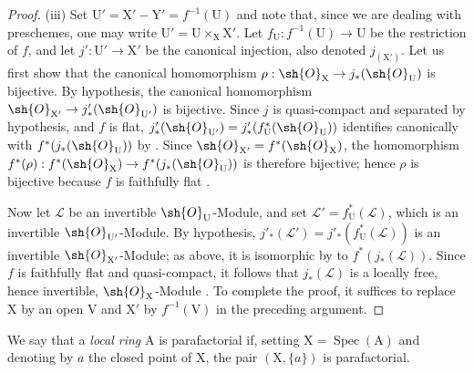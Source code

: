 \begin{proof}
(iii) Set $\mathrm{U}'=\mathrm{X}'-\mathrm{Y}'=f^{-1}(\mathrm{U})$ and note that, since we are dealing with preschemes, one may write $\mathrm{U}'=\mathrm{U}\times_{\mathrm{X}}\mathrm{X}'$. Let $f_{\mathrm{U}}:f^{-1}(\mathrm{U})\to\mathrm{U}$ be the restriction of $f$, and let $j':\mathrm{U}'\to\mathrm{X}'$ be the canonical injection, also denoted $j_{(\mathrm{X}')}$.
Let us first show that the canonical homomorphism $\rho:\sh{O}_{\mathrm{X}}\to j_*(\sh{O}_{\mathrm{U}})$ is bijective. By hypothesis, the canonical homomorphism $\sh{O}_{\mathrm{X}'}\to j'_*(\sh{O}_{\mathrm{U}'})$ is bijective. Since $j$ is quasi-compact and separated by hypothesis, and $f$ is flat, $j'_*(\sh{O}_{\mathrm{U}'})=j'_*(f_{\mathrm{U}}^*(\sh{O}_{\mathrm{U}}))$ identifies canonically with $f^*(j_*(\sh{O}_{\mathrm{U}}))$ by . Since $\sh{O}_{\mathrm{X}'}=f^*(\sh{O}_{\mathrm{X}})$, the homomorphism $f^*(\rho):f^*(\sh{O}_{\mathrm{X}})\to f^*(j_*(\sh{O}_{\mathrm{U}}))$ is therefore bijective; hence $\rho$ is bijective because $f$ is faithfully flat .

Now let $\mathscr{L}$ be an invertible $\sh{O}_{\mathrm{U}}$-Module, and set $\mathscr{L}'=f_{\mathrm{U}}^*(\mathscr{L})$, which is an invertible $\sh{O}_{\mathrm{U}'}$-Module. By hypothesis, $j'_*(\mathscr{L}')=j'_*(f_{\mathrm{U}}^*(\mathscr{L}))$ is an invertible $\sh{O}_{\mathrm{X}'}$-Module; as above, it is isomorphic by  to $f^*(j_*(\mathscr{L}))$. Since $f$ is faithfully flat and quasi-compact, it follows that $j_*(\mathscr{L})$ is a locally free, hence invertible, $\sh{O}_{\mathrm{X}}$-Module . To complete the proof, it suffices to replace $\mathrm{X}$ by an open $\mathrm{V}$ and $\mathrm{X}'$ by $f^{-1}(\mathrm{V})$ in the preceding argument.
\end{proof}

\begin{definition}[21.13.7]
\label{IV.21.13.7}
We say that a \emph{local ring} $\mathrm{A}$ is parafactorial if, setting $\mathrm{X}=\operatorname{Spec}(\mathrm{A})$ and denoting by $a$ the closed point of $\mathrm{X}$, the pair $(\mathrm{X},\{a\})$ is parafactorial.
\end{definition}

